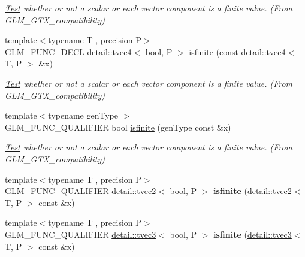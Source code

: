 \begin{DoxyCompactItemize}
\begin{DoxyCompactList}\small\item\em \hyperlink{class_test}{Test} whether or not a scalar or each vector component is a finite value. (From G\+L\+M\+\_\+\+G\+T\+X\+\_\+compatibility) \end{DoxyCompactList}\item 
{\footnotesize template$<$typename T , precision P$>$ }\\G\+L\+M\+\_\+\+F\+U\+N\+C\+\_\+\+D\+E\+CL \hyperlink{structglm_1_1detail_1_1tvec4}{detail\+::tvec4}$<$ bool, P $>$ \hyperlink{group__gtx__compatibility_gab256d4b6eaa066847d0629d6dde1dcba}{isfinite} (const \hyperlink{structglm_1_1detail_1_1tvec4}{detail\+::tvec4}$<$ T, P $>$ \&x)
\begin{DoxyCompactList}\small\item\em \hyperlink{class_test}{Test} whether or not a scalar or each vector component is a finite value. (From G\+L\+M\+\_\+\+G\+T\+X\+\_\+compatibility) \end{DoxyCompactList}\item 
{\footnotesize template$<$typename gen\+Type $>$ }\\G\+L\+M\+\_\+\+F\+U\+N\+C\+\_\+\+Q\+U\+A\+L\+I\+F\+I\+ER bool \hyperlink{group__gtx__compatibility_gaf4b04dcd3526996d68c1bfe17bfc8657}{isfinite} (gen\+Type const \&x)
\begin{DoxyCompactList}\small\item\em \hyperlink{class_test}{Test} whether or not a scalar or each vector component is a finite value. (From G\+L\+M\+\_\+\+G\+T\+X\+\_\+compatibility) \end{DoxyCompactList}\item 
{\footnotesize template$<$typename T , precision P$>$ }\\G\+L\+M\+\_\+\+F\+U\+N\+C\+\_\+\+Q\+U\+A\+L\+I\+F\+I\+ER \hyperlink{structglm_1_1detail_1_1tvec2}{detail\+::tvec2}$<$ bool, P $>$ {\bfseries isfinite} (\hyperlink{structglm_1_1detail_1_1tvec2}{detail\+::tvec2}$<$ T, P $>$ const \&x)\hypertarget{namespaceglm_a3ea9eec2f7755ca1b352104f086248cd}{}\label{namespaceglm_a3ea9eec2f7755ca1b352104f086248cd}

\item 
{\footnotesize template$<$typename T , precision P$>$ }\\G\+L\+M\+\_\+\+F\+U\+N\+C\+\_\+\+Q\+U\+A\+L\+I\+F\+I\+ER \hyperlink{structglm_1_1detail_1_1tvec3}{detail\+::tvec3}$<$ bool, P $>$ {\bfseries isfinite} (\hyperlink{structglm_1_1detail_1_1tvec3}{detail\+::tvec3}$<$ T, P $>$ const \&x)\hypertarget{namespaceglm_afc18c94c3f73fcbcc463c4beddfc61b6}{}\label{namespaceglm_afc18c94c3f73fcbcc463c4beddfc61b6}


\end{DoxyCompactItemize}
